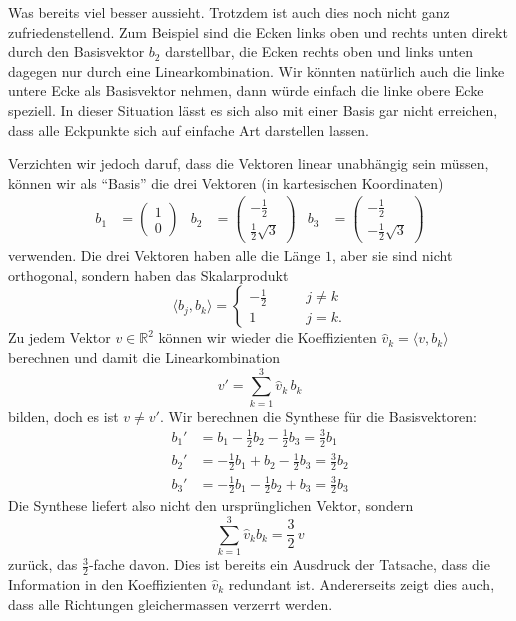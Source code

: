 Was bereits viel besser aussieht.
Trotzdem ist auch dies noch nicht ganz zufriedenstellend. 
Zum Beispiel sind die Ecken links oben und rechts unten direkt durch den
Basisvektor $b_2$ darstellbar, die Ecken rechts oben und links unten
dagegen nur durch eine Linearkombination.
Wir könnten natürlich auch die linke untere Ecke als Basisvektor nehmen,
dann würde einfach die linke obere Ecke speziell.
In dieser Situation lässt es sich also mit einer Basis gar nicht erreichen,
dass alle Eckpunkte sich auf einfache Art darstellen lassen.

Verzichten wir jedoch daruf, dass die Vektoren linear unabhängig sein müssen,
können wir als ``Basis'' die drei Vektoren (in kartesischen Koordinaten)
\begin{align}
b_1
&=
\begin{pmatrix}1\\0\end{pmatrix}
&
b_2
&=
\begin{pmatrix}-\frac12\\\frac12\sqrt{3}\end{pmatrix}
&
b_3
&=
\begin{pmatrix}-\frac12\\-\frac12\sqrt{3}\end{pmatrix}
\label{hexagonbasis}
\end{align}
verwenden.
Die drei Vektoren haben alle die Länge $1$, aber sie sind nicht
orthogonal, sondern haben das Skalarprodukt
\[
\langle b_j,b_k\rangle
=
\begin{cases}
-\frac12&\qquad j\ne k\\
1&\qquad j=k.
\end{cases}
\]
Zu jedem Vektor $v\in\mathbb R^2$ können wir wieder die Koeffizienten
$\hat{v}_k=\langle v,b_k\rangle$ berechnen und damit die Linearkombination
\[
v' = \sum_{k=1}^3 \hat{v}_k\,b_k
\]
bilden,
doch es ist $v\ne v'$.
Wir berechnen die Synthese für die Basisvektoren:
\begin{align*}
b_1'
&=
b_1 - \frac12 b_2 - \frac 12 b_3
=
\frac32b_1
\\
b_2'
&=
-\frac12 b_1 + b_2 -\frac12 b_3
=
\frac32b_2
\\
b_3'
&=
-\frac12b_1-\frac12 b_2 + b_3
=
\frac32b_3
\end{align*}
Die Synthese liefert also nicht den ursprünglichen Vektor, sondern
\begin{equation}
\sum_{k=1}^3 \hat{v}_k b_k = \frac32\,v
\label{geometrie:32beispiel}
\end{equation}
zurück, das $\frac32$-fache davon.
Dies ist bereits ein Ausdruck der Tatsache, dass die Information in den
Koeffizienten $\hat{v}_k$ redundant ist.
Andererseits zeigt dies auch, dass alle Richtungen gleichermassen
verzerrt werden.

